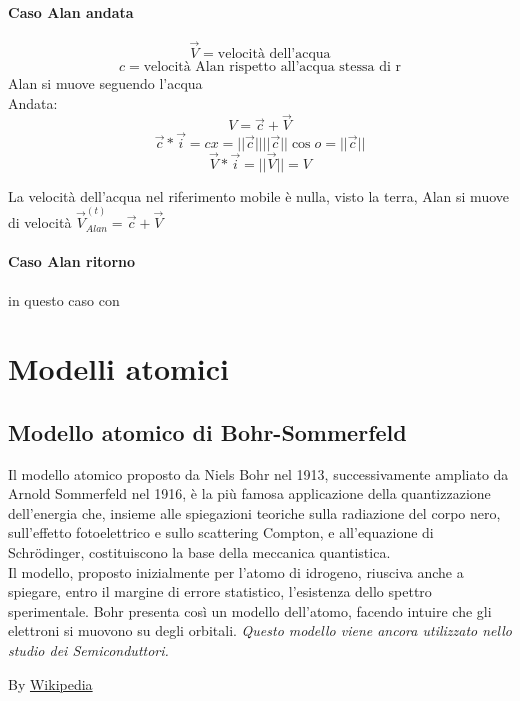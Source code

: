 \documentclass{book}
\begin{document}
\subsubsection{Caso Alan andata}
\begin{multicols}{2}
	\begin{equation*}
		\overrightarrow{V}=\text{velocità dell'acqua}
	\end{equation*}
	\begin{equation*}
		c=\text{velocità Alan rispetto all'acqua stessa di r}
	\end{equation*}
	Alan si muove seguendo l'acqua\\
	Andata:
	\begin{equation*}
		V=\overrightarrow{c}+\overrightarrow{V}
	\end{equation*}
	\begin{equation*}
		\overrightarrow{c}*\overrightarrow{i}=cx=||\overrightarrow{c}||||\overrightarrow{c}||\cos o=||\overrightarrow{c}||
	\end{equation*}
	\begin{equation*}
		\overrightarrow{V}*\overrightarrow{i}=||\overrightarrow{V}||=V
	\end{equation*}
\end{multicols}
La velocità dell'acqua nel riferimento mobile è nulla, visto la terra, Alan si muove di velocità $\overrightarrow{V}^{(t)}_{Alan}=\overrightarrow{c}+\overrightarrow{V}$
\subsubsection{Caso Alan ritorno}
in questo caso con 

\chapter{Modelli atomici}
\section{Modello atomico di Bohr-Sommerfeld}
Il modello atomico proposto da Niels Bohr nel 1913, successivamente ampliato da Arnold Sommerfeld nel 1916, è la più famosa applicazione della quantizzazione dell'energia che, insieme alle spiegazioni teoriche sulla radiazione del corpo nero, sull'effetto fotoelettrico e sullo scattering Compton, e all'equazione di Schrödinger, costituiscono la base della meccanica quantistica.\\
Il modello, proposto inizialmente per l'atomo di idrogeno, riusciva anche a spiegare, entro il margine di errore statistico, l'esistenza dello spettro sperimentale. Bohr presenta così un modello dell'atomo, facendo intuire che gli elettroni si muovono su degli orbitali. \textit{Questo modello viene ancora utilizzato nello studio dei Semiconduttori.} 
\begin{center}
	By \href{https://it.wikipedia.org/wiki/Modello_atomico_di_Bohr}{Wikipedia}
\end{center}
\end{document}
